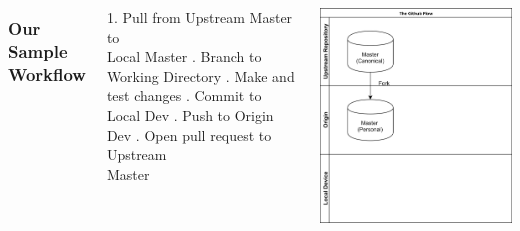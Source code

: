 \documentclass[unknownkeysallowed]{beamer}
\begin{document}
\begin{frame}
    \vspace{1cm}
	\begin{columns}
		\column{2.5in}
    \frametitle{Our Sample Workflow}
        1. Pull from Upstream Master to \\
        Local Master \linebreak{}. Branch to Working Directory \linebreak{}. Make and test changes \linebreak{}. Commit to Local Dev \linebreak{}. Push to Origin Dev \linebreak{}. Open pull request to Upstream \\
        Master
	\column{2.25in}
	\begin{center}
	\includegraphics[width = .9\linewidth]{assets/gitflow2}
	\end{center}
	\end{columns}
    \vspace{1cm}
\end{frame}
\end{document}
